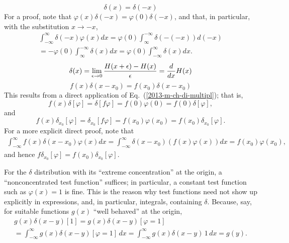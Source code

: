  \begin{equation}
 \delta (x)=\delta (-x)
 \end{equation}
{\color{OliveGreen}
\bproof
For a proof, note that $\varphi (x)\delta (-x) = \varphi (0)\delta (-x)$, and that, in particular,
with the substitution $x \rightarrow -x$,
 \begin{equation}
 \begin{split}
\int _{-\infty}^\infty \delta (-x)  \varphi(x) dx   =
 \varphi(0) \int _\infty ^{-\infty}\delta (-(-x))  d(-x) \\   =
-\varphi(0) \int _\infty ^{-\infty}\delta (x)  d x     =
\varphi(0) \int _{-\infty}^\infty \delta (x)  d x .
 \end{split}
 \end{equation}
\eproof
}
 \begin{equation}
 \delta (x)=\lim_{\epsilon \rightarrow 0}{H (x+\epsilon )
 -H (x)\over \epsilon }={d\over dx}H (x) \end{equation}
 \begin{equation}
 f (x)\delta (x-x_0)
 =
f (x_0)\delta (x-x_0)
 \end{equation}
{\color{OliveGreen}
\bproof
This results from a direct application of Eq.~(\ref{2013-m-ch-di-multipl}); that is,
 \begin{equation}
f(x) \delta
[\varphi ]
=
\delta
\left[  f  \varphi \right]
=
f(0)\varphi(0) = f(0)   \delta
[\varphi ]
,
 \end{equation}
and
 \begin{equation}
f(x) \delta_{x_0}
[\varphi ]
=
\delta_{x_0}
\left[  f  \varphi \right]
=
f({x_0})\varphi({x_0}) = f({x_0})   \delta_{x_0}
[\varphi ]
.
 \end{equation}
For a more explicit direct proof, note that
 \begin{equation}
 \begin{split}
\int _{-\infty}^\infty f (x)\delta (x-x_0)  \varphi(x) dx
=
\int _{-\infty}^\infty\delta (x-x_0)  ( f (x)\varphi(x) ) dx = f(x_0) \varphi(x_0)
,
 \end{split}
 \end{equation}
and hence $f \delta_{x_0}[ \varphi ] =   f(x_0)\delta_{x_0}[ \varphi ]$.
\eproof
}

For the $\delta$ distribution with its ``extreme concentration'' at the origin, a ``nonconcentrated test function'' suffices; in particular, a constant test function
such as $\varphi (x) = 1$ is fine.
This is the reason why test functions need not show up explicitly in expressions, and, in particular, integrals, containing $\delta$.
Because, say, for suitable functions $g(x)$ ``well behaved'' at the origin,
 \begin{equation}
 \begin{split}
g(x)\delta(x-y)[1]=g(x)\delta(x-y)[\varphi =1] \\
=\int_{-\infty}^{\infty} g(x)\delta(x-y)[\varphi =1]\,dx = \int_{-\infty}^{\infty} g(x)\delta(x-y)\,1 \,dx =g(y).
  \end{split}
\end{equation}

